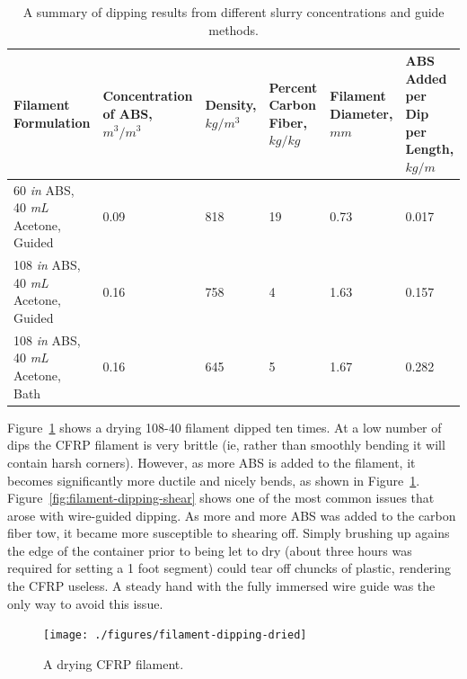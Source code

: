 \begin{table}[h!]
    \centering
    \begin{tabular}{p{1.5in}|p{1in}|p{0.75in}|p{0.75in}|p{0.75in}|p{0.75in}}
        Filament Formulation & Concentration of ABS, $m^3/m^3$ & Density, $kg/m^3$ & Percent Carbon Fiber, $kg/kg$ & Filament Diameter, $mm$ & ABS Added per Dip per Length, $kg/m$  \\ \hline \hline
        60 \textit{in} ABS, 40 \textit{mL} Acetone, Guided & 0.09 & 818 & 19 & 0.73 & 0.017 \\ \hline
        108 \textit{in} ABS, 40 \textit{mL} Acetone, Guided & 0.16 & 758 & 4 & 1.63 & 0.157 \\ \hline
        108 \textit{in} ABS, 40 \textit{mL} Acetone, Bath & 0.16 & 645 & 5 & 1.67 & 0.282 \\
 
    \end{tabular}
    \caption{A summary of dipping results from different slurry concentrations and guide methods.}
    \label{tab:dipping-results}
\end{table}


Figure~\ref{fig:filament-dipping-dried} shows a drying 108-40 filament dipped ten times. At a low number of dips the CFRP filament is very brittle (ie, rather than smoothly bending it will contain harsh corners). However, as more ABS is added to the filament, it becomes significantly more ductile and nicely bends, as shown in Figure~\ref{fig:filament-dipping-dried}. Figure~\ref{fig:filament-dipping-shear} shows one of the most common issues that arose with wire-guided dipping. As more and more ABS was added to the carbon fiber tow, it became more susceptible to shearing off. Simply brushing up agains the edge of the container prior to being let to dry (about three hours was required for setting a 1 foot segment) could tear off chuncks of plastic, rendering the CFRP useless. A steady hand with the fully immersed wire guide was the only way to avoid this issue.\\

\begin{figure}[htp]
    \centering
    \texttt{[image: ./figures/filament-dipping-dried]}
    \caption{A drying CFRP filament.}
    \label{fig:filament-dipping-dried}
\end{figure}

